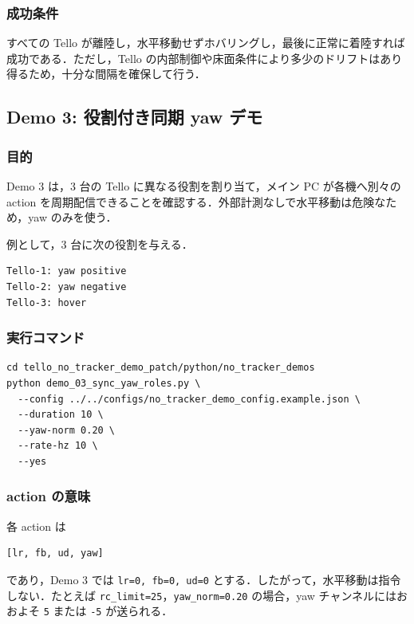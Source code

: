 \subsubsection{成功条件}

すべての Tello が離陸し，水平移動せずホバリングし，最後に正常に着陸すれば成功である．ただし，Tello の内部制御や床面条件により多少のドリフトはあり得るため，十分な間隔を確保して行う．

\subsection{Demo 3: 役割付き同期 yaw デモ}

\subsubsection{目的}

Demo 3 は，3 台の Tello に異なる役割を割り当て，メイン PC が各機へ別々の action を周期配信できることを確認する．外部計測なしで水平移動は危険なため，yaw のみを使う．

例として，3 台に次の役割を与える．

\begin{lstlisting}
Tello-1: yaw positive
Tello-2: yaw negative
Tello-3: hover
\end{lstlisting}

\subsubsection{実行コマンド}

\begin{lstlisting}
cd tello_no_tracker_demo_patch/python/no_tracker_demos
python demo_03_sync_yaw_roles.py \
  --config ../../configs/no_tracker_demo_config.example.json \
  --duration 10 \
  --yaw-norm 0.20 \
  --rate-hz 10 \
  --yes
\end{lstlisting}

\subsubsection{action の意味}

各 action は

\begin{lstlisting}
[lr, fb, ud, yaw]
\end{lstlisting}

であり，Demo 3 では \texttt{lr=0, fb=0, ud=0} とする．したがって，水平移動は指令しない．たとえば \texttt{rc\_limit=25}，\texttt{yaw\_norm=0.20} の場合，yaw チャンネルにはおおよそ \texttt{5} または \texttt{-5} が送られる．

